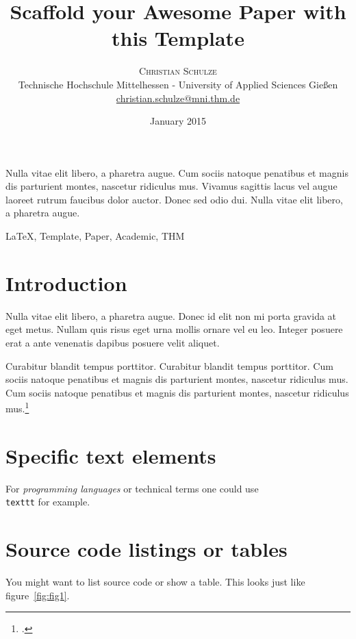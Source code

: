 \documentclass[a4paper]{article}
\title{Scaffold your Awesome Paper with this Template}
\author{
  \large
  \textsc{Christian Schulze} \\
  \normalsize Technische Hochschule Mittelhessen - University of Applied 
  Sciences Gießen \\
  \normalsize
    \href{mailto:christian.schulze@mni.thm.de}{christian.schulze@mni.thm.de}
}
\date{January 2015}
\begin{document}
\maketitle

\begin{theabstract}
  Nulla vitae elit libero, a pharetra augue. Cum sociis natoque penatibus et 
  magnis dis parturient montes, nascetur ridiculus mus. Vivamus sagittis lacus 
  vel augue laoreet rutrum faucibus dolor auctor. Donec sed odio dui. Nulla 
  vitae elit libero, a pharetra augue.
\end{theabstract}

\begin{keywords}
	\LaTeX, Template, Paper, Academic, THM
\end{keywords}

\begin{multicols}{2}

\section{Introduction}
Nulla vitae elit libero, a pharetra augue. Donec id elit non mi porta gravida at 
eget metus. Nullam quis risus eget urna mollis ornare vel eu leo. Integer 
posuere erat a ante venenatis dapibus posuere velit aliquet.

Curabitur blandit tempus porttitor. Curabitur blandit tempus porttitor. Cum 
sociis natoque penatibus et magnis dis parturient montes, nascetur ridiculus 
mus. Cum sociis natoque penatibus et magnis dis parturient montes, nascetur 
ridiculus mus.\footcite{tab-atkins:css-nesting}


\section{Specific text elements}
For {\em programming languages} or technical terms one could use 
\texttt{\\texttt} for example.

\section{Source code listings or tables}
You might want to list source code or show a table. This looks just like 
figure~\ref{fig:fig1}.
\end{multicols}
\end{document}
